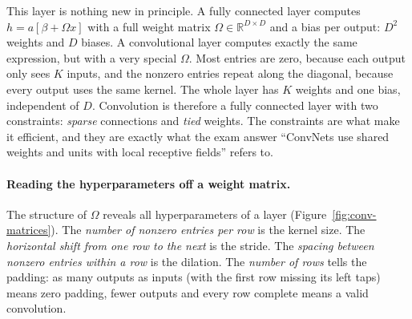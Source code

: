 This layer is nothing new in principle. A fully connected layer computes $h = a[\beta + \Omega x]$ with a full weight
matrix $\Omega\in\mathbb{R}^{D\times D}$ and a bias per output: $D^2$ weights
and $D$ biases. A convolutional layer computes exactly the same expression, but
with a very special $\Omega$. Most entries are zero, because each output only
sees $K$ inputs, and the nonzero entries repeat along the diagonal, because every
output uses the same kernel. The whole layer has $K$ weights and one bias,
independent of $D$. Convolution is therefore a fully connected layer with two
constraints: \emph{sparse} connections and \emph{tied} weights. The constraints
are what make it efficient, and they are exactly what the exam answer ``ConvNets
use shared weights and units with local receptive fields'' refers to.

\paragraph{Reading the hyperparameters off a weight matrix.}
The structure of $\Omega$ reveals all hyperparameters of a layer
(Figure~\ref{fig:conv-matrices}). The \emph{number of nonzero entries per row} is
the kernel size. The \emph{horizontal shift from one row to the next} is the
stride. The \emph{spacing between nonzero entries within a row} is the dilation.
The \emph{number of rows} tells the padding: as many outputs as inputs (with the
first row missing its left taps) means zero padding, fewer outputs and every row
complete means a valid convolution.

